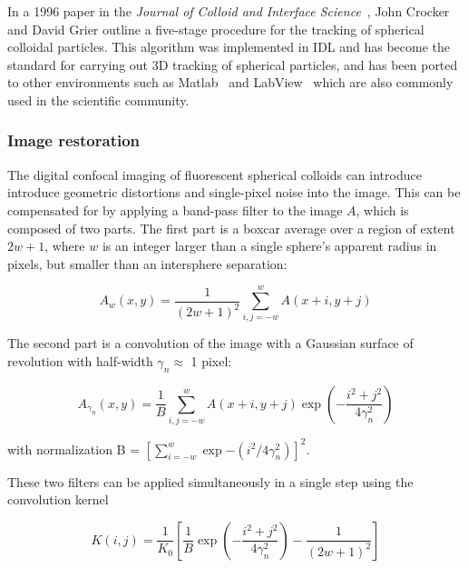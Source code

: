 In a 1996 paper in the \textit{Journal of Colloid and Interface Science}~\cite{crocker-grier-spheres},
John Crocker and David Grier outline a five-stage procedure for the tracking of
spherical colloidal particles.  This algorithm was implemented in IDL and has become the standard for carrying out 
3D tracking of spherical particles, and has been ported to other environments such as 
Matlab~\cite{blair-dufrense-matlab, kilfoil-matlab} and LabView~\cite{optical-trapping-group} which are
also commonly used in the scientific community.

\subsubsection{Image restoration}

The digital confocal imaging of 
fluorescent spherical colloids can introduce introduce geometric distortions and single-pixel
noise into the image.  This can be compensated for by applying a band-pass filter 
to the image $A$, which is composed of two parts.
The first part is a boxcar average over a region of extent $2w + 1$, where $w$ is an integer
larger than a single sphere's apparent radius in pixels, but smaller than an intersphere separation:

\begin{center}\begin{equation}A_w(x,y) = \frac{1}{(2w+1)^2} \sum_{i,j=-w}^w A(x+i,y+j)
\end{equation}\end{center}

The second part is a convolution of the image with a Gaussian surface of revolution with 
half-width $\gamma_n \approx $ 1 pixel:

\begin{center}\begin{equation}A_{\gamma_n}(x,y) = \frac{1}{B} \sum_{i,j=-w}^w A(x+i,y+j)\exp{\left(-\frac{i^2+j^2}{4\gamma_n^2}\right)}
\end{equation}\end{center}

with normalization B = $[\sum_{i=-w}^w \exp{-(i^2/4\gamma_n^2)}]^2$.

These two filters can be applied simultaneously in a single step using the convolution kernel

\begin{center}\begin{equation}K(i,j) = \frac{1}{K_0} \left[ \frac{1}{B} \exp{ \left( -\frac{i^2+j^2}{4\gamma_n^2} \right)} -
\frac{1}{(2w+1)^2} \right]
\end{equation}\end{center}

